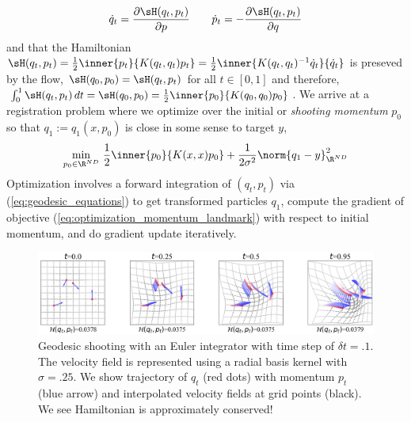 \documentclass[11pt]{article}
\begin{document}
\begin{align}
    \dot{q}_t
        = \frac{\partial \sH(q_t,p_t)}{\partial p}
    \quad\quad
    \dot{p}_t
        = - \frac{\partial \sH(q_t,p_t)}{\partial q}
    \label{eq:geodesic_equations}
\end{align}
and that the Hamiltonian $\sH(q_t,p_t) = \frac{1}{2}\inner{p_t}{K(q_t,q_t)p_t} = \frac{1}{2}\inner{K(q_t,q_t)^{-1}\dot{q}_t}{\dot{q}_t}$ is preseved by the flow, $\sH(q_0,p_0)  = \sH(q_t,p_t)$ for all $t\in [0,1]$ and therefore, $\int_0^1 \sH(q_t,p_t) \, dt = \sH(q_0, p_0) = \frac{1}{2} \inner{ p_0 }{ K(q_0,q_0) p_0 }$. We arrive at a registration problem where we optimize over the initial or \textit{shooting momentum} $p_0$ so that $q_1 := q_1(x,p_0)$ is close in some sense to target $y$,
\begin{align}
    \min_{p_0\in\R^{ND}} \,
        \frac{1}{2} \inner{ p_0 }{ K(x,x) p_0 } + \frac{1}{2\sigma^2} \norm{q_1 - y}_{\R^{ND}}^2
    \label{eq:optimization_momentum_landmark}
\end{align}
Optimization involves a forward integration of $(q_t,p_t)$ via (\ref{eq:geodesic_equations}) to get transformed particles $q_1$, compute the gradient of objective (\ref{eq:optimization_momentum_landmark}) with respect to initial momentum, and do gradient update iteratively.


\begin{center} 
\begin{figure}[h!]
    \includegraphics[width=\textwidth]{assets/plt_shooting} 
    \caption{Geodesic shooting with an Euler integrator with time step of $\delta t = .1$. The velocity field is represented using a radial basis kernel with $\sigma=.25$. We show trajectory of $q_t$ (red dots) with momentum $p_t$ (blue arrow) and interpolated velocity fields at grid points (black). We see Hamiltonian is approximately conserved!}
    \label{fig:plt_shooting}
\end{figure} 
\end{center} 
 
\end{document}
